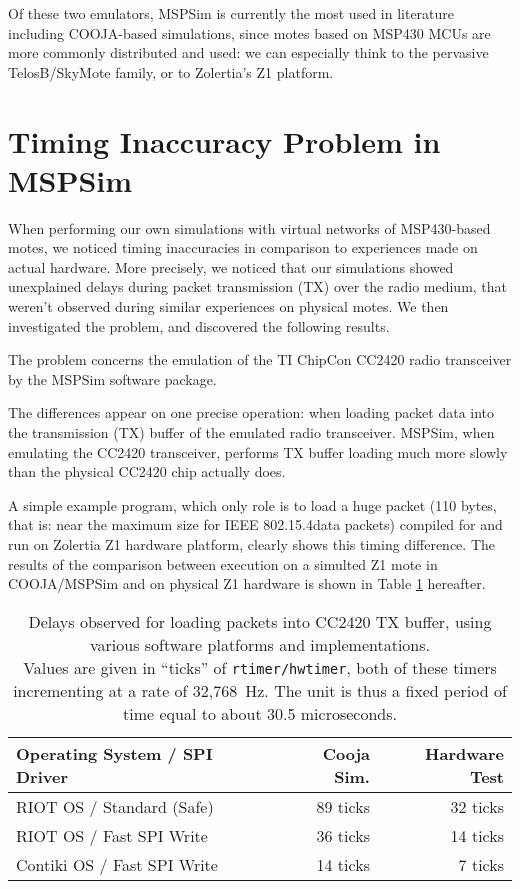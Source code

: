 \documentclass[a4paper,10pt]{article}
\begin{document}
Of these two emulators, MSPSim is currently the most used in literature
including COOJA-based simulations, since motes based on MSP430 MCUs are
more commonly distributed and used: we can especially think to the pervasive
TelosB/SkyMote family, or to Zolertia's Z1 platform.


\section{Timing Inaccuracy Problem in MSPSim}

When performing our own simulations with virtual networks of MSP430-based
motes, we noticed timing inaccuracies in comparison to experiences made
on actual hardware. More precisely, we noticed that our simulations showed
unexplained delays during packet transmission (TX) over the radio medium,
that weren't observed during similar experiences on physical motes.
We then investigated the problem, and discovered the following results.

The problem concerns the emulation of the TI ChipCon CC2420 radio
transceiver by the MSPSim software package.

The differences appear on one precise operation: when loading packet data
into the transmission (TX) buffer of the emulated radio transceiver.
MSPSim, when emulating the CC2420 transceiver, performs TX buffer loading
much more slowly than the physical CC2420 chip actually does.

A simple example program, which only role is to load a huge packet
(110 bytes, that is: near the maximum size for IEEE
802.15.4\footnotemark[1] data packets) compiled for and run on
Zolertia Z1 hardware platform, clearly shows this timing difference.
The results of the comparison between execution on a simulted Z1 mote
in COOJA/MSPSim and on physical Z1 hardware is shown in Table
\ref{TblTXPktLoadDelays} hereafter.


\begin{table}[!h]
\centering
\begin{tabular}{|l|r|r|}
\hline
Operating System / SPI Driver &  Cooja Sim.  & Hardware Test \\
\hline
RIOT OS / Standard (Safe)     &   89 ticks   &  32 ticks \\ 
RIOT OS / Fast SPI Write      &   36 ticks   &  14 ticks \\
Contiki OS / Fast SPI Write   &   14 ticks   &   7 ticks \\
\hline
\end{tabular}
\caption{\small Delays observed for loading packets into CC2420 TX buffer,
using various software platforms and implementations.\\
Values are given in ``ticks'' of \texttt{rtimer/hwtimer}, both of these
timers incrementing at a rate of 32,768~Hz. The unit is thus a fixed period
of time equal to about 30.5 microseconds.}
\label{TblTXPktLoadDelays}
\end{table}
\end{document}
